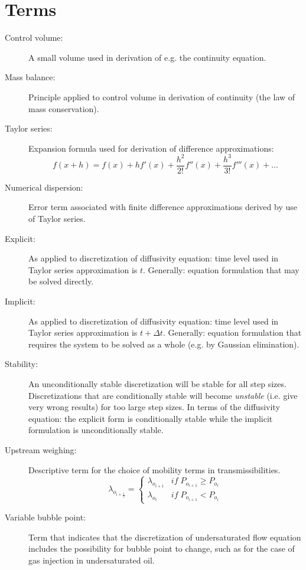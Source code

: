 
\section{Terms} %
\label{sec:terms}

\begin{description}
  \item[Control volume:] A small volume used in derivation of e.g. the continuity equation.
  \item[Mass balance:] Principle applied to control volume in derivation of continuity (the law of mass conservation).
  \item[Taylor series:] Expansion formula used for derivation of difference approximations:
    \begin{equation}
      f(x+h) = f(x) + h f'(x) + \frac{h^2}{2!} f''(x) + \frac{h^3}{3!} f'''(x) + \dots
    \end{equation}
  \item[Numerical dispersion:] Error term associated with finite difference approximations derived by use of Taylor series.
  \item[Explicit:] As applied to discretization of diffusivity equation: time level used in Taylor series approximation is $t$. Generally: equation formulation that may be solved directly.
  \item[Implicit:] As applied to discretization of diffusivity equation: time level used in Taylor series approximation is $t+\Delta t$. Generally: equation formulation that requires the system to be solved as a whole (e.g. by Gaussian elimination).
  \item[Stability:] An unconditionally stable discretization will be stable for all step sizes. Discretizations that are conditionally stable will become \emph{unstable} (i.e. give very wrong results) for too large step sizes. In terms of the diffusivity equation: the explicit form is conditionally stable while the implicit formulation is unconditionally stable.
  \item[Upstream weighing:] Descriptive term for the choice of mobility terms in transmissibilities.
    \[
      \lambda_{o_{i+\frac{1}{2}}} =
      \begin{cases}
        \lambda_{o_{i+1}} & if \; P_{o_{i+1}} \geq P_{o_i} \\
        \lambda_{o_{i}}   & if \; P_{o_{i+1}} < P_{o_i}
      \end{cases}
    \]
  \item[Variable bubble point:] Term that indicates that the discretization of undersaturated flow equation includes the possibility for bubble point to change, such as for the case of gas injection in undersaturated oil.

\end{description}
